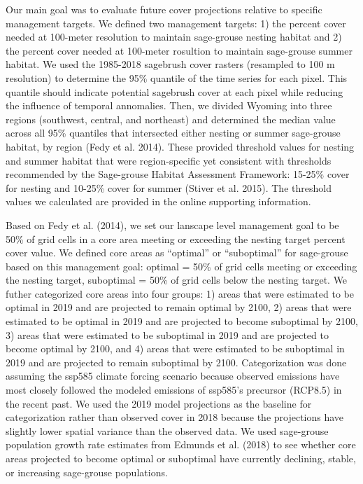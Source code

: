 \documentclass[
  12pt,
]{article}
\begin{document}
Our main goal was to evaluate future cover projections relative to specific management targets.
We defined two management targets: 1) the percent cover needed at 100-meter resolution to maintain sage-grouse nesting habitat and 2) the percent cover needed at 100-meter rosultion to maintain sage-grouse summer habitat.
We used the 1985-2018 sagebrush cover rasters (resampled to 100 m resolution) to determine the 95\% quantile of the time series for each pixel.
This quantile should indicate potential sagebrush cover at each pixel while reducing the influence of temporal annomalies.
Then, we divided Wyoming into three regions (southwest, central, and northeast) and determined the median value across all 95\% quantiles that intersected either nesting or summer sage-grouse habitat, by region (Fedy et al. 2014).
These provided threshold values for nesting and summer habitat that were region-specific yet consistent with thresholds recommended by the Sage-grouse Habitat Assessment Framework: 15-25\% cover for nesting and 10-25\% cover for summer (Stiver et al. 2015).
The threshold values we calculated are provided in the online supporting information.

Based on Fedy et al. (2014), we set our lanscape level management goal to be 50\% of grid cells in a core area meeting or exceeding the nesting target percent cover value.
We defined core areas as ``optimal'' or ``suboptimal'' for sage-grouse based on this management goal: optimal = 50\% of grid cells meeting or exceeding the nesting target, suboptimal = 50\% of grid cells below the nesting target.
We futher categorized core areas into four groups: 1) areas that were estimated to be optimal in 2019 and are projected to remain optimal by 2100, 2) areas that were estimated to be optimal in 2019 and are projected to become suboptimal by 2100, 3) areas that were estimated to be suboptimal in 2019 and are projected to become optimal by 2100, and 4) areas that were estimated to be suboptimal in 2019 and are projected to remain suboptimal by 2100.
Categorization was done assuming the ssp585 climate forcing scenario because observed emissions have most closely followed the modeled emissions of ssp585's precursor (RCP8.5) in the recent past.
We used the 2019 model projections as the baseline for categorization rather than observed cover in 2018 because the projections have slightly lower spatial variance than the observed data.
We used sage-grouse population growth rate estimates from Edmunds et al. (2018) to see whether core areas projected to become optimal or suboptimal have currently declining, stable, or increasing sage-grouse populations.
\end{document}
